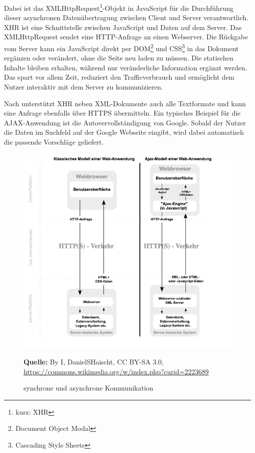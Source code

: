 Dabei ist das XMLHttpRequest\footnote{kurz: XHR}-Objekt in JavaScript für die Durchführung dieser asynchronen Datenübertragung zwischen Client und Server verantwortlich. XHR ist eine Schnittstelle zwischen JavaScript und Daten auf dem Server. Das XMLHttpRequest sendet eine HTTP-Anfrage an einen Webserver. Die Rückgabe vom Server kann ein JavaScript direkt per DOM\footnote{Document Object Modal} und CSS\footnote{Cascading Style Sheets} in das Dokument ergänzen oder verändert, ohne die Seite neu laden zu müssen. Die statischen Inhalte bleiben erhalten, während nur veränderliche Information ergänzt werden. Das spart vor allem Zeit, reduziert den Trafficverbrauch und ermöglicht dem Nutzer interaktiv mit dem Server zu kommunizieren.\bigskip

Nach \cite{o.V.2017} unterstützt XHR neben XML-Dokumente auch alle Textformate und kann eine Anfrage ebenfalls über HTTPS übermitteln.
Ein typisches Beispiel für die AJAX-Anwendung ist die Autovervollständigung von Google. Sobald der Nutzer die Daten im Suchfeld auf der Google Webseite eingibt, wird dabei automatisch die passende Vorschläge geliefert. 

\begin{figure}[H]
  \begin{center}
    \includegraphics[scale=0.4]{img/ajax-modell}
	\caption{synchrone und asynchrone Kommunikation}
	\footnotesize\sffamily\textbf{Quelle:} By I, DanielSHaischt, CC BY-SA 3.0, \url{https://commons.wikimedia.org/w/index.php?curid=2223689} 
	\label{fig:ajax-modell}
  \end{center}   
\end{figure}

